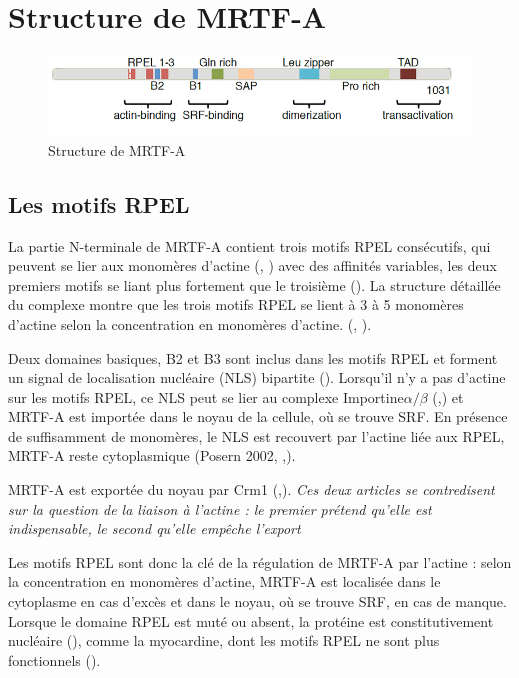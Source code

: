 \documentclass{report}
\begin{document}
\section*{Structure de MRTF-A}

\begin{figure}
\center
\includegraphics[scale=0.5]{MRTFA_structure.png}
\caption{Structure de MRTF-A \parencite{scharenberg_tgf-_2014}}
\end{figure}
 \subsection{Les motifs RPEL}
 
 La partie N-terminale de MRTF-A contient trois motifs RPEL consécutifs, qui peuvent se lier aux monomères d'actine (\cite{posern_mutant_2004}, \cite{mouilleron_molecular_2008}) avec des affinités variables, les deux premiers motifs se liant plus fortement que le troisième (\cite{guettler_rpel_2008}). La structure détaillée du complexe montre que les trois motifs RPEL se lient à 3 à 5 monomères d'actine selon la concentration en monomères d'actine. (\cite{hirano_sensing_2011}, \cite{treisman_structure_2011}). 
 
 Deux domaines basiques, B2 et B3 sont inclus dans les motifs RPEL et forment un signal de localisation nucléaire (NLS) bipartite (\cite{rajakyla_actin-regulated_2010}). Lorsqu'il n'y a pas d'actine sur les motifs RPEL, ce NLS peut se lier au complexe Importine$\alpha / \beta$ (\cite{hirano_sensing_2011},\cite{rajakyla_actin-regulated_2010}) et MRTF-A est importée dans le noyau de la cellule, où se trouve SRF. En présence de suffisamment de monomères, le NLS est recouvert par l'actine liée aux RPEL, MRTF-A reste cytoplasmique (Posern 2002, \cite{miralles_actin_2003},\cite{posern_mutant_2004}). 
 
 MRTF-A est exportée du noyau par Crm1 (\cite{vartiainen_nuclear_2007},\cite{hayashi_differences_2013}). \emph{Ces deux articles se contredisent sur la question de la liaison à l'actine : le premier prétend qu'elle est indispensable, le second qu'elle empêche l'export} 
 
 Les motifs RPEL sont donc la clé de la régulation de MRTF-A par l'actine : selon la concentration en monomères d'actine, MRTF-A est localisée dans le cytoplasme en cas d'excès et dans le noyau, où se trouve SRF, en cas de manque. Lorsque le domaine RPEL est muté ou absent, la protéine est constitutivement nucléaire (\cite{miralles_actin_2003}), comme la myocardine, dont les motifs RPEL ne sont plus fonctionnels (\cite{guettler_rpel_2008}). 
 
\end{document}
